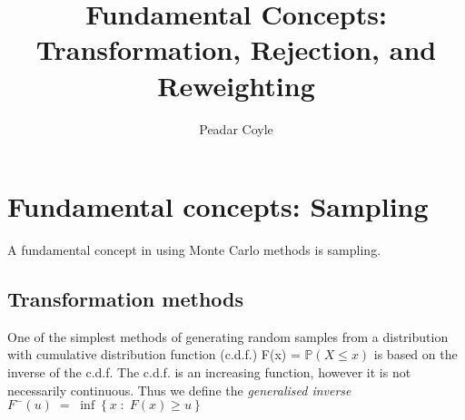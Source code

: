 \documentclass[a4paper,10pt]{article}
\title{Fundamental Concepts: Transformation, Rejection, and Reweighting}
\author{Peadar Coyle}
\begin{document}
\maketitle

\begin{abstract}

\end{abstract}

\section{Fundamental concepts: Sampling}
A fundamental concept in using Monte Carlo methods is sampling.
\subsection{Transformation methods}
One of the simplest methods of generating random samples from a distribution with cumulative distribution function 
(c.d.f.) F(x) = $\mathbb{P}(X \leq x)$ is based on the inverse of the c.d.f.
   The c.d.f. is an increasing function, however it is not necessarily continuous. Thus
   we define the \textit{generalised inverse} $F^{-}(u)\;=\; \inf\left\lbrace x\;:\;F(x) \geq u\right\rbrace$
\end{document}
